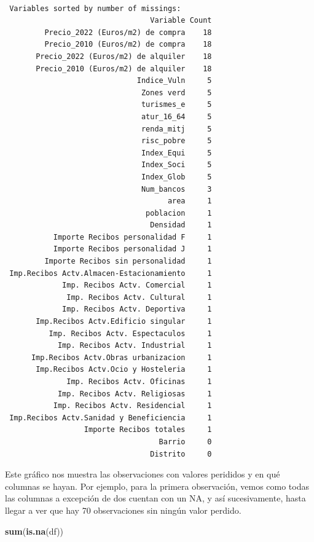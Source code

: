 \documentclass[notspecified,article,submit,moreauthors,pdftex]{Definitions/mdpi}
\newenvironment{Shaded}{\begin{snugshade}}{\end{snugshade}}
\newcommand{\FunctionTok}[1]{\textcolor[rgb]{0.13,0.29,0.53}{\textbf{#1}}}
\newcommand{\NormalTok}[1]{#1}
\begin{document}
\begin{verbatim}

 Variables sorted by number of missings: 
                                 Variable Count
         Precio_2022 (Euros/m2) de compra    18
         Precio_2010 (Euros/m2) de compra    18
       Precio_2022 (Euros/m2) de alquiler    18
       Precio_2010 (Euros/m2) de alquiler    18
                              Indice_Vuln     5
                               Zones verd     5
                               turismes_e     5
                               atur_16_64     5
                               renda_mitj     5
                               risc_pobre     5
                               Index_Equi     5
                               Index_Soci     5
                               Index_Glob     5
                               Num_bancos     3
                                     area     1
                                poblacion     1
                                 Densidad     1
           Importe Recibos personalidad F     1
           Importe Recibos personalidad J     1
         Importe Recibos sin personalidad     1
 Imp.Recibos Actv.Almacen-Estacionamiento     1
             Imp. Recibos Actv. Comercial     1
              Imp. Recibos Actv. Cultural     1
             Imp. Recibos Actv. Deportiva     1
       Imp.Recibos Actv.Edificio singular     1
          Imp. Recibos Actv. Espectaculos     1
            Imp. Recibos Actv. Industrial     1
      Imp.Recibos Actv.Obras urbanizacion     1
       Imp.Recibos Actv.Ocio y Hosteleria     1
              Imp. Recibos Actv. Oficinas     1
            Imp. Recibos Actv. Religiosas     1
           Imp. Recibos Actv. Residencial     1
 Imp.Recibos Actv.Sanidad y Beneficiencia     1
                  Importe Recibos totales     1
                                   Barrio     0
                                 Distrito     0
\end{verbatim}

Este gráfico nos muestra las observaciones con valores perididos y en
qué columnas se hayan. Por ejemplo, para la primera observación, vemos
como todas las columnas a excepción de dos cuentan con un NA, y así
sucesivamente, hasta llegar a ver que hay 70 observaciones sin ningún
valor perdido.

\begin{Shaded}
\begin{Highlighting}[]
\FunctionTok{sum}\NormalTok{(}\FunctionTok{is.na}\NormalTok{(df))}
\end{Highlighting}
\end{Shaded}
\end{document}
